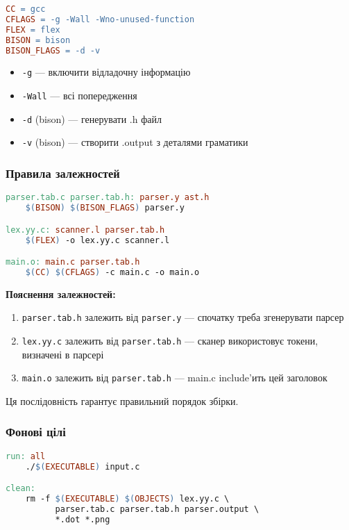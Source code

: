 \documentclass[12pt,a4paper]{article}
\begin{document}
\begin{lstlisting}[language=make]
CC = gcc
CFLAGS = -g -Wall -Wno-unused-function
FLEX = flex
BISON = bison
BISON_FLAGS = -d -v
\end{lstlisting}

\begin{itemize}
    \item \texttt{-g} --- включити відладочну інформацію
    \item \texttt{-Wall} --- всі попередження
    \item \texttt{-d} (bison) --- генерувати .h файл
    \item \texttt{-v} (bison) --- створити .output з деталями граматики
\end{itemize}

\subsubsection{Правила залежностей}

\begin{lstlisting}[language=make]
parser.tab.c parser.tab.h: parser.y ast.h
	$(BISON) $(BISON_FLAGS) parser.y

lex.yy.c: scanner.l parser.tab.h
	$(FLEX) -o lex.yy.c scanner.l

main.o: main.c parser.tab.h
	$(CC) $(CFLAGS) -c main.c -o main.o
\end{lstlisting}

\textbf{Пояснення залежностей:}

\begin{enumerate}
    \item \texttt{parser.tab.h} залежить від \texttt{parser.y} --- спочатку треба згенерувати парсер
    \item \texttt{lex.yy.c} залежить від \texttt{parser.tab.h} --- сканер використовує токени, визначені в парсері
    \item \texttt{main.o} залежить від \texttt{parser.tab.h} --- main.c include'ить цей заголовок
\end{enumerate}

Ця послідовність гарантує правильний порядок збірки.

\subsubsection{Фонові цілі}

\begin{lstlisting}[language=make]
run: all
	./$(EXECUTABLE) input.c

clean:
	rm -f $(EXECUTABLE) $(OBJECTS) lex.yy.c \
	      parser.tab.c parser.tab.h parser.output \
	      *.dot *.png
\end{lstlisting}
\end{document}
